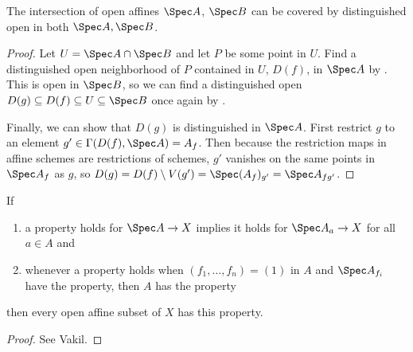 \begin{lem}\label{lem:nike}
	The intersection of open affines $\Spec A $, $\Spec B $ can be covered by distinguished open in both $\Spec A, \Spec B $.
\end{lem}
\begin{proof}
	Let $U = \Spec A \cap \Spec B $ and let $P $ be some point in $U $.
	Find a distinguished open neighborhood of $P $ contained in $U $, $D(f)$, in $\Spec A $ by .
	This is open in $\Spec B $, so we can find a distinguished open $D(g) \subseteq D(f) \subseteq U \subseteq \Spec B$ once again by .

	Finally, we can show that $D(g) $ is distinguished in $\Spec A $.
	First restrict $g $ to an element $g' \in \Gamma(D(f), \Spec A) = A_f$.
	Then because the restriction maps in affine schemes are restrictions of schemes, $g' $ vanishes on the same points in $\Spec A_f $ as $g $, so $D(g) = D(f) \setminus V(g') = \Spec (A_f)_{g'} = \Spec A_{fg'}$.
\end{proof}

\begin{lem}\label{lem:affine_comm}
	If 
	\begin{enumerate}
		\item a property holds for $\Spec A \to X $ implies it holds for $\Spec A_a\to X $ for all $a\in A $ and
		\item whenever a property holds when $(f_1,\ldots,f_n) = (1) $ in $A $ and $\Spec A_{f_i} $ have the property, then $A $ has the property
	\end{enumerate}
	then every open affine subset of $X $ has this property.
\end{lem}
\begin{proof}
	See Vakil.
\end{proof}

